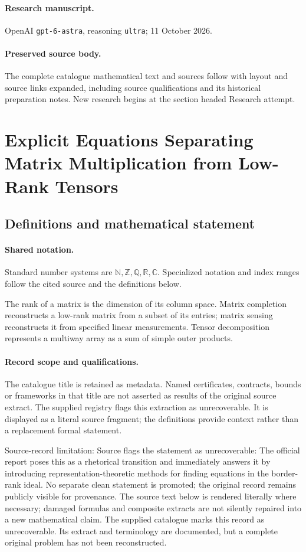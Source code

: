 \documentclass[11pt]{article}
\begin{document}
\paragraph{Research manuscript.} OpenAI \texttt{gpt-6-astra}, reasoning \texttt{ultra}; 11 October 2026.
\paragraph{Preserved source body.} The complete catalogue mathematical text and sources follow with layout and source links expanded, including source qualifications and its historical preparation notes. New research begins at the section headed Research attempt.

\section{Explicit Equations Separating Matrix Multiplication from Low-Rank Tensors}\label{statement}

\subsection{Definitions and mathematical statement}

\paragraph{Shared notation.}Standard number systems are $\mathbb N,\mathbb Z,\mathbb Q,\mathbb R,\mathbb C$. Specialized notation and index ranges follow the cited source and the definitions below.


The rank of a matrix is the dimension of its column space. Matrix completion reconstructs a low-rank matrix from a subset of its entries; matrix sensing reconstructs it from specified linear measurements. Tensor decomposition represents a multiway array as a sum of simple outer products.
\paragraph{Record scope and qualifications.}
The catalogue title is retained as metadata. Named certificates, contracts, bounds or frameworks in that title are not asserted as results of the original source extract.
The supplied registry flags this extraction as unrecoverable. It is displayed as a literal source fragment; the definitions provide context rather than a replacement formal statement.

Source-record limitation: Source flags the statement as unrecoverable: The official report poses this as a rhetorical transition and immediately answers it by introducing representation-theoretic methods for finding equations in the border-rank ideal. No separate clean statement is promoted; the original record remains publicly visible for provenance.
The source text below is rendered literally where necessary; damaged formulas and composite extracts are not silently repaired into a new mathematical claim.
The supplied catalogue marks this record as unrecoverable. Its extract and terminology are documented, but a complete original problem has not been reconstructed.
\end{document}
